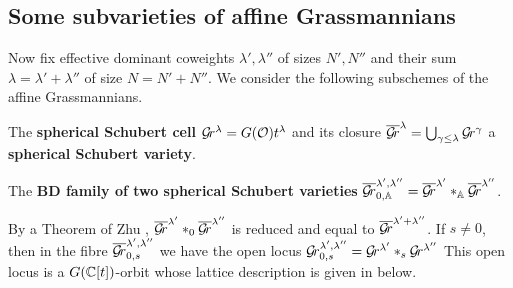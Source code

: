 \documentclass{article} %
\begin{document}
\subsection{Some subvarieties of affine Grassmannians}
\label{ss:subgrs}
Now fix effective dominant coweights $\lambda', \lambda'' $ of sizes $N',N''$  and their sum $ \lambda = \lambda' + \lambda'' $ of size $ N = N'+N''$. 
We consider the following subschemes of the affine Grassmannians.
% 
\begin{definition}
\label{def:sphschub}
    The \textbf{spherical Schubert cell} $\mathcal{G}\!r^\lambda = G(\mathcal O) t^\lambda$ and its closure 
    $ \overline{\mathcal{G}\!r}^\lambda = \bigcup_{\gamma \le \lambda} \mathcal{G}\!r^{\gamma} $ 
    a \textbf{spherical Schubert variety}.  
\end{definition}
\begin{definition}
\label{def:sphfus}
    The \textbf{BD family of two spherical Schubert varieties} $\overline{\mathcal{G}\!r}^{\lambda', \lambda''}_{0, \mathbb A} = \overline{\mathcal{G}\!r}^{\lambda'} \ast_\mathbb A \overline{\mathcal{G}\!r}^{\lambda''} $.
\end{definition}
By a Theorem of Zhu \cite[Proposition 3.1.14]{zhu2016introduction}, $ \overline{\mathcal{G}\!r}^{\lambda'} \ast_0 \overline{\mathcal{G}\!r}^{\lambda''} $ is reduced and equal to  $ \overline{\mathcal{G}\!r}^{\lambda' + \lambda''}$.
If $s\ne0$, then in the fibre $\overline{\mathcal{G}\!r}_{0,s}^{\lambda', \lambda''}$ we have the open locus $ \mathcal{G}\!r_{0,s}^{\lambda', \lambda''} =  \mathcal{G}\!r^{\lambda'} \ast_s \mathcal{G}\!r^{\lambda''} $
This open locus is a $ G(\mathbb C[t])$-orbit
whose lattice description is given in  below.
\end{document}
